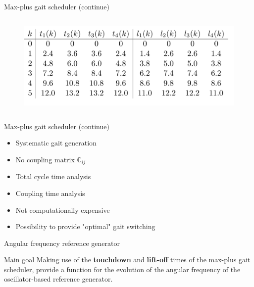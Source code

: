 \documentclass{beamer}
\begin{document}
\begin{frame}{Max-plus gait scheduler (continue)}
\begin{columns}
\begin{column}{0.5\textwidth}
	\begin{figure}[ht]\centering
		\includegraphics[width=1\textwidth]{images/EventsList.png}
	\end{figure}
\end{column}
\end{columns}
\end{frame}

\begin{frame}{Max-plus gait scheduler (continue)}
\begin{itemize}
	\setlength\itemsep{2em}
	\item Systematic gait generation 
	\item No coupling matrix $\mathbb{C}_{ij}$
	\item Total cycle time analysis
	\item Coupling time analysis
	\item Not computationally expensive
	\item Possibility to provide "optimal" gait switching
\end{itemize}	
\end{frame}

\begin{frame}{Angular frequency reference generator}
	\begin{block}{Main goal}
		\Large Making use of the \textbf{touchdown} and \textbf{lift-off} times of the max-plus gait scheduler, provide a function for the evolution of the angular frequency of the oscillator-based reference generator.
	\end{block}
\end{frame}
\end{document}
